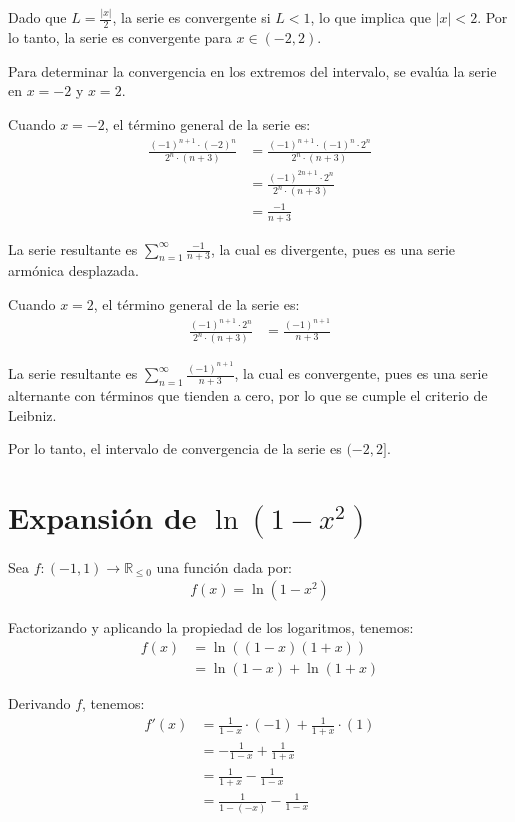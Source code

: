 \documentclass{article}
\newcommand{\R}{\mathbb{R}}
\begin{document}
Dado que $L = \frac{|x|}{2}$, la serie es convergente si $L < 1$, lo que implica que $|x| < 2$. Por lo tanto, la serie es convergente para $x \in (-2, 2)$.

Para determinar la convergencia en los extremos del intervalo, se evalúa la serie en $x = -2$ y $x = 2$.

Cuando $x = -2$, el término general de la serie es:
\begin{align*}
\frac{(-1)^{n+1} \cdot (-2)^n}{2^n \cdot (n+3)} &= \frac{(-1)^{n+1} \cdot (-1)^n \cdot 2^n}{2^n \cdot (n+3)} \\
&= \frac{(-1)^{ 2n+1} \cdot 2^n}{2^n \cdot (n+3)} \\
&= \frac{-1}{n+3}
\end{align*}

La serie resultante es $\sum_{n=1}^{\infty} \frac{-1}{n+3}$, la cual es divergente, pues es una serie armónica desplazada.

Cuando $x = 2$, el término general de la serie es:
\begin{align*}
\frac{(-1)^{n+1} \cdot 2^n}{2^n \cdot (n+3)} &= \frac{(-1)^{n+1}}{n+3}
\end{align*}

La serie resultante es $\sum_{n=1}^{\infty} \frac{(-1)^{n+1}}{n+3}$, la cual es convergente, pues es una serie alternante con términos que tienden a cero, por lo que se cumple el criterio de Leibniz.

Por lo tanto, el intervalo de convergencia de la serie es $(-2, 2]$.

\section{Expansión de $\ln(1-x^2)$}

Sea $f : (-1, 1) \to \R_{\leq 0}$ una función dada por:
\begin{align*}
f(x) = \ln(1-x^2)
\end{align*}

Factorizando y aplicando la propiedad de los logaritmos, tenemos:
\begin{align*}
f(x) &= \ln((1-x)(1+x)) \\
&= \ln(1-x) + \ln(1+x)
\end{align*}

Derivando $f$, tenemos:
\begin{align*}
f'(x) &= \frac{1}{1-x} \cdot (-1) + \frac{1}{1+x} \cdot (1) \\
&= -\frac{1}{1-x} + \frac{1}{1+x} \\
&= \frac{1}{1+x} - \frac{1}{1-x} \\
&= \frac{1}{1-(-x)} - \frac{1}{1-x} \\
\end{align*}
\end{document}
